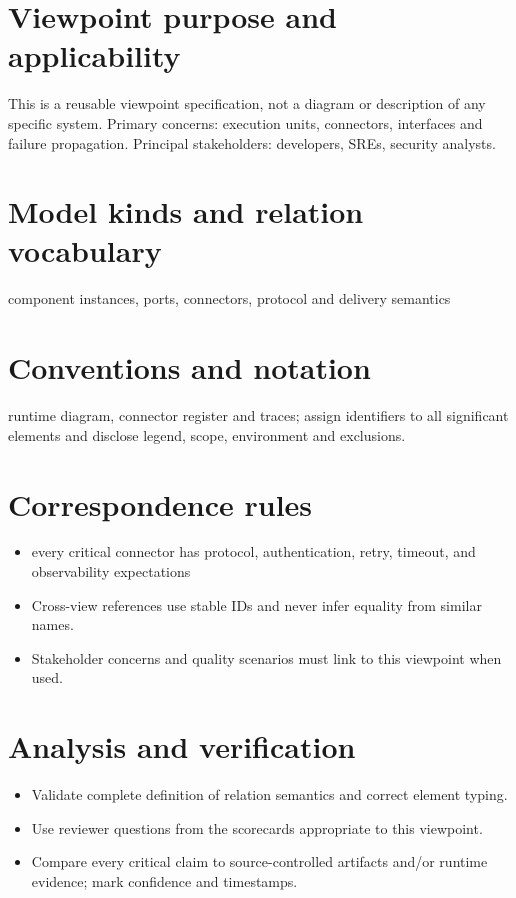 \documentclass[10pt,letterpaper]{article}
\begin{document}
\DocProvenance
\section{Viewpoint purpose and applicability}
This is a reusable viewpoint specification, not a diagram or description of any specific system. Primary concerns: execution units, connectors, interfaces and failure propagation. Principal stakeholders: developers, SREs, security analysts.

\section{Model kinds and relation vocabulary}
component instances, ports, connectors, protocol and delivery semantics

\section{Conventions and notation}
runtime diagram, connector register and traces; assign identifiers to all significant elements and disclose legend, scope, environment and exclusions.

\section{Correspondence rules}
\begin{itemize}
\item every critical connector has protocol, authentication, retry, timeout, and observability expectations
\item Cross-view references use stable IDs and never infer equality from similar names.
\item Stakeholder concerns and quality scenarios must link to this viewpoint when used.
\end{itemize}
\section{Analysis and verification}
\begin{itemize}
\item Validate complete definition of relation semantics and correct element typing.
\item Use reviewer questions from the scorecards appropriate to this viewpoint.
\item Compare every critical claim to source-controlled artifacts and/or runtime evidence; mark confidence and timestamps.
\end{itemize}
\end{document}
